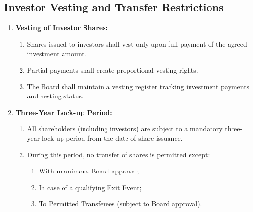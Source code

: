 \subsection{Investor Vesting and Transfer Restrictions}
\begin{enumerate}[label=(\alph*)]
\item \textbf{Vesting of Investor Shares:}
    \begin{enumerate}[label=(\roman*)]
    \item Shares issued to investors shall vest only upon full payment of the agreed investment amount.
    \item Partial payments shall create proportional vesting rights.
    \item The Board shall maintain a vesting register tracking investment payments and vesting status.
    \end{enumerate}

\item \textbf{Three-Year Lock-up Period:}
    \begin{enumerate}[label=(\roman*)]
    \item All shareholders (including investors) are subject to a mandatory three-year lock-up period from the date of share issuance.
    \item During this period, no transfer of shares is permitted except:
        \begin{enumerate}[label=(\alph*)]
        \item With unanimous Board approval;
        \item In case of a qualifying Exit Event;
        \item To Permitted Transferees (subject to Board approval).
        \end{enumerate}
    \end{enumerate}


\end{enumerate}
